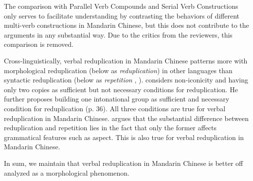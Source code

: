 \documentclass[fleqn,twoside]{article}
\begin{document}
\begin{enumerate}
The comparison with Parallel Verb Compounds and Serial Verb Constructions only serves to facilitate understanding
by contrasting the behaviors of different multi-verb constructions in Mandarin Chinese,
but this does not contribute to the arguments in any substantial way.
Due to the critics from the reviewers, this comparison is removed.

Cross-linguistically, verbal reduplication in Mandarin Chinese patterns more with morphological reduplication (below as \textit{reduplication}) in other languages
than syntactic reduplication (below as \textit{repetition} \citealt[31]{Gil2005}, \citealt[1--2]{Forza2016}).
\citet[35--36]{Gil2005} considers non-iconicity and having only two copies as sufficient but not necessary conditions for reduplication.
He further proposes building one intonational group as sufficient and necessary condition for reduplication (p. 36).
All three conditions are true for verbal reduplication in Mandarin Chinese.
\citet[9]{Forza2016} argues that the substantial difference between reduplication and repetition lies in the fact that only the former affects grammatical features such as aspect.
This is also true for verbal reduplication in Mandarin Chinese.

In sum, we maintain that verbal reduplication in Mandarin Chinese is better off analyzed as a morphological phenomenon.


\end{enumerate}
\end{document}
